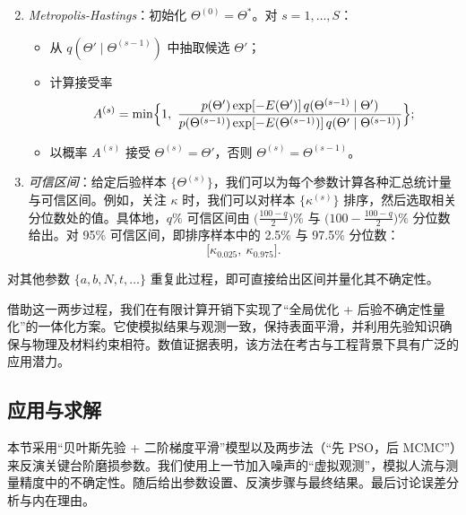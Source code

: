\documentclass[11pt,a4paper,fontset=windows]{ctexart}
\begin{document}
\begin{enumerate}\setcounter{enumi}{1}
\item \textit{Metropolis-Hastings}：初始化 $\Theta^{(0)}=\Theta^{*}$。对 $s=1,\dots,S$：
\begin{itemize}
\item 从 $q(\Theta'\mid\Theta^{(s-1)})$ 中抽取候选 $\Theta'$；
\item 计算接受率
\[
A^{(s)}=\min\Bigl\{1,\ \frac{p(\Theta')\exp[-E(\Theta')]\,q(\Theta^{(s-1)}\mid\Theta')}
{p(\Theta^{(s-1)})\exp[-E(\Theta^{(s-1)})]\,q(\Theta'\mid\Theta^{(s-1)})}\Bigr\};
\]
\item 以概率 $A^{(s)}$ 接受 $\Theta^{(s)}=\Theta'$，否则 $\Theta^{(s)}=\Theta^{(s-1)}$。
\end{itemize}
\item \textit{可信区间}：给定后验样本 $\{\Theta^{(s)}\}$，我们可以为每个参数计算各种汇总统计量与可信区间。例如，关注 $\kappa$ 时，我们可以对样本 $\{\kappa^{(s)}\}$ 排序，然后选取相关分位数处的值。具体地，$q\%$ 可信区间由 $\bigl(\frac{100-q}{2}\bigr)\%$ 与 $\bigl(100-\frac{100-q}{2}\bigr)\%$ 分位数给出。对 95\% 可信区间，即排序样本中的 2.5\% 与 97.5\% 分位数：
\[
\bigl[\kappa_{0.025},\ \kappa_{0.975}\bigr].
\]
\end{enumerate}

对其他参数 $\{a,b,N,t,\dots\}$ 重复此过程，即可直接给出区间并量化其不确定性。

借助这一两步过程，我们在有限计算开销下实现了“全局优化 + 后验不确定性量化”的一体化方案。它使模拟结果与观测一致，保持表面平滑，并利用先验知识确保与物理及材料约束相符。数值证据表明，该方法在考古与工程背景下具有广泛的应用潜力。

\subsection{应用与求解}

本节采用“贝叶斯先验 + 二阶梯度平滑”模型以及两步法（“先 PSO，后 MCMC”）来反演关键台阶磨损参数。我们使用上一节加入噪声的“虚拟观测”，模拟人流与测量精度中的不确定性。随后给出参数设置、反演步骤与最终结果。最后讨论误差分析与内在理由。
\end{document}
